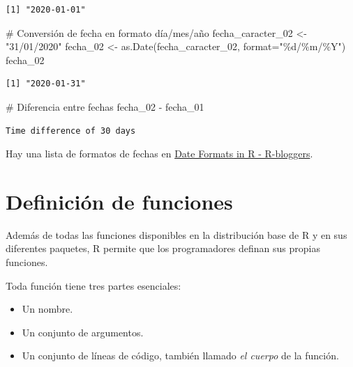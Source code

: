 \documentclass[
  letterpaper,
  DIV=11,
  numbers=noendperiod]{scrreprt}
\newenvironment{Shaded}{\begin{snugshade}}{\end{snugshade}}
\newcommand{\AttributeTok}[1]{\textcolor[rgb]{0.40,0.45,0.13}{#1}}
\newcommand{\CommentTok}[1]{\textcolor[rgb]{0.37,0.37,0.37}{#1}}
\newcommand{\FunctionTok}[1]{\textcolor[rgb]{0.28,0.35,0.67}{#1}}
\newcommand{\NormalTok}[1]{\textcolor[rgb]{0.00,0.23,0.31}{#1}}
\newcommand{\OtherTok}[1]{\textcolor[rgb]{0.00,0.23,0.31}{#1}}
\newcommand{\SpecialCharTok}[1]{\textcolor[rgb]{0.37,0.37,0.37}{#1}}
\newcommand{\StringTok}[1]{\textcolor[rgb]{0.13,0.47,0.30}{#1}}
\providecommand{\tightlist}{%
  \setlength{\itemsep}{0pt}\setlength{\parskip}{0pt}}\usepackage{longtable,booktabs,array}
\begin{document}
\begin{verbatim}
[1] "2020-01-01"
\end{verbatim}

\begin{Shaded}
\begin{Highlighting}[]
\CommentTok{\# Conversión de fecha en formato día/mes/año}
\NormalTok{fecha\_caracter\_02 }\OtherTok{\textless{}{-}} \StringTok{"31/01/2020"}
\NormalTok{fecha\_02 }\OtherTok{\textless{}{-}} \FunctionTok{as.Date}\NormalTok{(fecha\_caracter\_02, }\AttributeTok{format=}\StringTok{"\%d/\%m/\%Y"}\NormalTok{)}
\NormalTok{fecha\_02}
\end{Highlighting}
\end{Shaded}

\begin{verbatim}
[1] "2020-01-31"
\end{verbatim}

\begin{Shaded}
\begin{Highlighting}[]
\CommentTok{\# Diferencia entre fechas}
\NormalTok{fecha\_02 }\SpecialCharTok{{-}}\NormalTok{ fecha\_01}
\end{Highlighting}
\end{Shaded}

\begin{verbatim}
Time difference of 30 days
\end{verbatim}

Hay una lista de formatos de fechas en
\href{https://www.r-bloggers.com/date-formats-in-r/}{Date Formats in R -
R-bloggers}.

\hypertarget{definiciuxf3n-de-funciones}{%
\section{Definición de funciones}\label{definiciuxf3n-de-funciones}}

Además de todas las funciones disponibles en la distribución base de R y
en sus diferentes paquetes, R permite que los programadores definan sus
propias funciones.

Toda función tiene tres partes esenciales:

\begin{itemize}
\tightlist
\item
  Un nombre.
\item
  Un conjunto de argumentos.
\item
  Un conjunto de líneas de código, también llamado \emph{el cuerpo} de
  la función.
\end{itemize}
\end{document}

